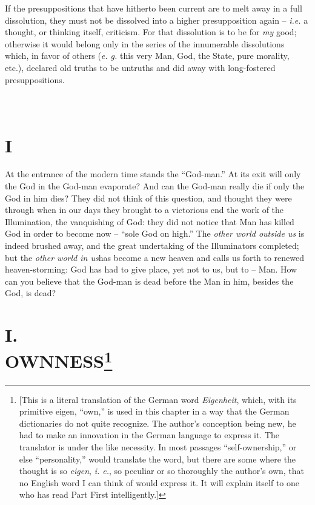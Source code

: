 \documentclass[12pt,a4paper]{book}
\begin{document}
If the presuppositions that have hitherto been current are to melt away in a 
full dissolution, they must not be dissolved into a higher presupposition 
again -- \textit{i.e.} a thought, or thinking itself, criticism. For that 
dissolution is to be for \textit{my} good; otherwise it would belong only in 
the series of the innumerable dissolutions which, in favor of others 
(\textit{e. g.} this very Man, God, the State, pure morality, etc.), declared 
old truths to be untruths and did away with long-fostered presuppositions.

\chapter[Part Second: I]{\\
I}

\medskip{}

\noindent{}At the entrance of the modern time stands the ``God-man.'' At its 
exit will only the God in the God-man evaporate? And can the God-man really 
die if only the God in him dies? They did not think of this question, and 
thought they were through when in our days they brought to a victorious end 
the work of the Illumination, the vanquishing of God: they did not notice that 
Man has killed God in order to become now -- ``sole God on high.'' The 
\textit{other world outside us} is indeed brushed away, and the great 
undertaking of the Illuminators completed; but the \textit{other world in 
us}has become a new heaven and calls us forth to renewed heaven-storming: God 
has had to give place, yet not to us, but to -- Man. How can you believe that 
the God-man is dead before the Man in him, besides the God, is dead?

\medskip{}

\chapter[I. Ownness]{\centering I.\\
OWNNESS\footnote{[This is a literal translation of the German word 
\textit{Eigenheit}, which, with its primitive eigen, ``own,'' is used in 
this chapter in a way that the German dictionaries do not quite recognize. The 
author's conception being new, he had to make an innovation in the German 
language to express it. The translator is under the like necessity. In most 
passages ``self-ownership,'' or else ``personality,'' would translate the 
word, but there are some where the thought is so \textit{eigen}, \textit{i. 
e.}, so peculiar or so thoroughly the author's own, that no English word I can 
think of would express it. It will explain itself to one who has read Part 
First intelligently.]}}
\end{document}
